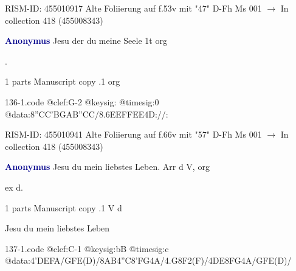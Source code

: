 \documentclass[twocolumn]{book}
\begin{document}
\newline RISM-ID: 455010917
\newline Alte Foliierung auf f.53v mit "47"
\newline D-Fh  Ms 001
\newline $\rightarrow$ In collection 418 (455008343)

\newline \par \vspace{7pt} \textcolor{darkblue}{\textbf{Anonymus  }}
\newline Jesu der du meine Seele  1t  
\newline org
\newline \begin{itshape}[f.66v, at left:] .\end{itshape} 
\newline \textcolor{darkblue}{}  1 parts  
\newline Manuscript copy
.1  org  
\begin{filecontents*}{136-1.code}
@clef:G-2
@keysig:
@timesig:0
@data:{8''CC'BG}{AB''CC}/{8.6EEFF}{EE}4D://:
\end{filecontents*}
\newline
%

\newline RISM-ID: 455010941
\newline Alte Foliierung auf f.66v mit "57"
\newline D-Fh  Ms 001
\newline $\rightarrow$ In collection 418 (455008343)

\newline \par \vspace{7pt} \textcolor{darkblue}{\textbf{Anonymus  }}
\newline Jesu du mein liebstes Leben. Arr  d  
\newline V, org
\newline \begin{itshape}[f.96v, at left:] ex d.\end{itshape} 
\newline \textcolor{darkblue}{}  1 parts  
\newline Manuscript copy
.1  V  d
\newline \begin{footnotesize} Jesu du mein liebstes Leben \end{footnotesize}  
\begin{filecontents*}{137-1.code}
@clef:C-1
@keysig:bB
@timesig:c
@data:4'DEFA/GFE(D)/{8AB}4''C{8'FG}4A/4.G8F2(F)/4DE{8FG}4A/GFE(D)/
\end{filecontents*}
\newline
%
\end{document}
